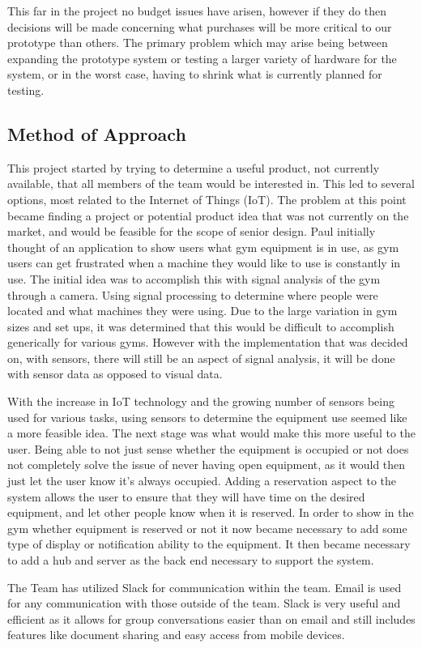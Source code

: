 \documentclass[PPFS.tex]{template/subfiles}
\begin{document}
    This far in the project no budget issues have arisen, however if they do then decisions will be made concerning what purchases will be more critical to our prototype than others. The primary problem which may arise being between expanding the prototype system or testing a larger variety of hardware for the system, or in the worst case, having to shrink what is currently planned for testing.  
	
	\subsection{Method of Approach}
	This project started by trying to determine a useful product, not currently available, that all members of the team would be interested in. This led to several options, most related to the Internet of Things (IoT). The problem at this point became finding a project or potential product idea that was not currently on the market, and would be feasible for the scope of senior design. Paul initially thought of an application to show users what gym equipment is in use, as gym users can get frustrated when a machine they would like to use is constantly in use. The initial idea was to accomplish this with signal analysis of the gym through a camera. Using signal processing to determine where people were located and what machines they were using. Due to the large variation in gym sizes and set ups, it was determined that this would be difficult to accomplish generically for various gyms. However with the implementation that was decided on, with sensors, there will still be an aspect of signal analysis, it will be done with sensor data as opposed to visual data.  
	
	With the increase in IoT technology and the growing number of sensors being used for various tasks, using sensors to determine the equipment use seemed like a more feasible idea. The next stage was what would make this more useful to the user. Being able to not just sense whether the equipment is occupied or not does not completely solve the issue of never having open equipment, as it would then just let the user know it's always occupied. Adding a reservation aspect to the system allows the user to ensure that they will have time on the desired equipment, and let other people know when it is reserved. In order to show in the gym whether equipment is reserved or not it now became necessary to add some type of display or notification ability to the equipment. It then became necessary to add a hub and server as the back end necessary to support the system.
	
	The Team has utilized Slack for communication within the team. Email is used for any communication with those outside of the team. Slack is very useful and efficient as it allows for group conversations easier than on email and still includes features like document sharing and easy access from mobile devices. 
	
\end{document}
